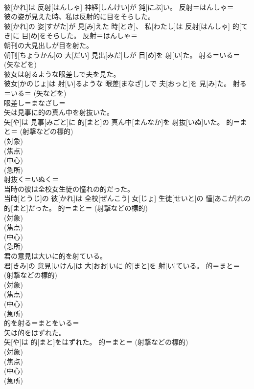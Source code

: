 \documentclass[8pt]{extreport}
\begin{document}
\begin{CJK}{UTF8}{min}
{\\	彼[かれ]は 反射[はんしゃ] 神経[しんけい]が 鈍[にぶ]い。	反射＝はんしゃ＝ 
\\	彼の姿が見えた時、私は反射的に目をそらした。	
\\	彼[かれ]の 姿[すがた]が 見[み]えた 時[とき]、 私[わたし]は 反射[はんしゃ] 的[てき]に 目[め]をそらした。	反射＝はんしゃ＝ 
\\	朝刊の大見出しが目を射た。	
\\	朝刊[ちょうかん]の 大[だい] 見出[みだ]しが 目[め]を 射[い]た。	射る＝いる＝ (矢などを) 
\\	彼女は射るような眼差しで夫を見た。	
\\	彼女[かのじょ]は 射[い]るような 眼差[まなざ]しで 夫[おっと]を 見[み]た。	射る＝いる＝ (矢などを) 
\\	眼差し＝まなざし＝ 
\\	矢は見事に的の真ん中を射抜いた。	
\\	矢[や]は 見事[みごと]に 的[まと]の 真ん中[まんなか]を 射抜[いぬ]いた。	的＝まと＝ (射撃などの標的) 
\\	(対象) 
\\	(焦点) 
\\	(中心) 
\\	(急所) 
\\	射抜く＝いぬく＝ 
\\	当時の彼は全校女生徒の憧れの的だった。	
\\	当時[とうじ]の 彼[かれ]は 全校[ぜんこう] 女[じょ] 生徒[せいと]の 憧[あこが]れの 的[まと]だった。	的＝まと＝ (射撃などの標的) 
\\	(対象) 
\\	(焦点) 
\\	(中心) 
\\	(急所) 
\\	君の意見は大いに的を射ている。	
\\	君[きみ]の 意見[いけん]は 大[おお]いに 的[まと]を 射[い]ている。	的＝まと＝ (射撃などの標的) 
\\	(対象) 
\\	(焦点) 
\\	(中心) 
\\	(急所) 
\\	的を射る＝まとをいる＝ 
\\	矢は的をはずれた。	
\\	矢[や]は 的[まと]をはずれた。	的＝まと＝ (射撃などの標的) 
\\	(対象) 
\\	(焦点) 
\\	(中心) 
\\	(急所) 
}
\end{CJK}
\end{document}
